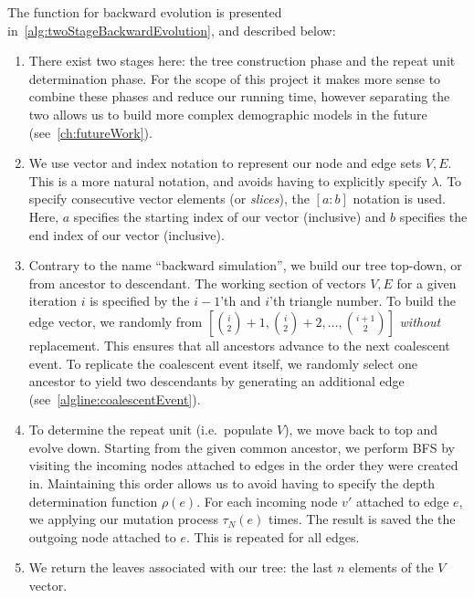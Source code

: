The function for backward evolution is presented in~\autoref{alg:twoStageBackwardEvolution}, and described below:
\begin{enumerate}
    \item There exist two stages here: the tree construction phase and the repeat unit determination phase.
        For the scope of this project it makes more sense to combine these phases and reduce our running time, however
        separating the two allows us to build more complex demographic models in the future
        (see~\autoref{ch:futureWork}).
    \item We use vector and index notation to represent our node and edge sets $V, E$.
        This is a more natural notation, and avoids having to explicitly specify $\lambda$.
        To specify consecutive vector elements (or \emph{slices}), the $[a:b]$ notation is used.
        Here, $a$ specifies the starting index of our vector (inclusive) and $b$ specifies the end index of our
        vector (inclusive).
    \item Contrary to the name ``backward simulation'', we build our tree top-down, or from ancestor to descendant.
        The working section of vectors $V, E$ for a given iteration $i$ is specified by the $i - 1$'th and $i$'th
        triangle number.
        To build the edge vector, we randomly from $\left[\binom{i}{2} + 1, \binom{i}{2} + 2, \ldots,
        \binom{i + 1}{2}\right]$
        \emph{without} replacement.
        This ensures that all ancestors advance to the next coalescent event.
        To replicate the coalescent event itself, we randomly select one ancestor to yield two descendants by generating
        an additional edge (see~\autoref{algline:coalescentEvent}).
    \item To determine the repeat unit (i.e.\ populate $V$), we move back to top and evolve down.
        Starting from the given common ancestor, we perform BFS by visiting the incoming nodes attached to edges in
        the order they were created in.
        Maintaining this order allows us to avoid having to specify the depth determination function $\rho(e)$.
        For each incoming node $v'$ attached to edge $e$, we applying our mutation process $\tau_N(e)$ times.
        The result is saved the the outgoing node attached to $e$.
        This is repeated for all edges.
    \item We return the leaves associated with our tree: the last $n$ elements of the $V$ vector.
\end{enumerate}

